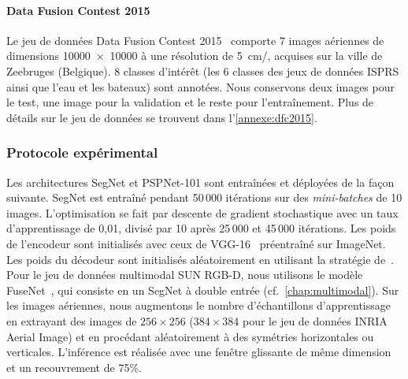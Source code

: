 \paragraph{Data Fusion Contest 2015}
Le jeu de données Data Fusion Contest 2015~\cite{campos-taberner_processing_2016} comporte 7 images aériennes de dimensions \SI{10000x10000}{\px} à une résolution de  \SI{5}{\centi\meter/\px}, acquises sur la ville de Zeebruges (Belgique). 8 classes d'intérêt (les 6 classes des jeux de données \gls{ISPRS} ainsi que l'eau et les bateaux) sont annotées. Nous conservons deux images pour le test, une image pour la validation et le reste pour l'entraînement. Plus de détails sur le jeu de données se trouvent dans l'\cref{annexe:dfc2015}.

\subsubsection{Protocole expérimental}

Les architectures \gls{SegNet} et PSPNet-101 sont entraînées et déployées de la façon suivante. SegNet est entraîné pendant 50\,000 itérations sur des \emph{mini-batches} de 10 images. L'optimisation se fait par descente de gradient stochastique avec un taux d'apprentissage de 0,01, divisé par 10 après 25\,000 et 45\,000 itérations. Les poids de l'encodeur sont initialisés avec ceux de VGG-16~\cite{simonyan_very_2015} préentraîné sur ImageNet. Les poids du décodeur sont initialisés aléatoirement en utilisant la stratégie de~\citet{he_delving_2015}.
Pour le jeu de données multimodal SUN RGB-D, nous utilisons le modèle FuseNet~\cite{hazirbas_fusenet_2016}, qui consiste en un SegNet à double entrée (cf.~\cref{chap:multimodal}).
Sur les images aériennes, nous augmentons le nombre d'échantillons d'apprentissage en extrayant des images de $256\times256$ ($384\times384$ pour le jeu de données INRIA Aerial Image) et en procédant aléatoirement à des symétries horizontales ou verticales. L'inférence est réalisée avec une fenêtre glissante de même dimension et un recouvrement de 75\%.

